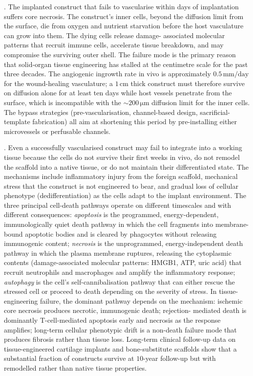 . The implanted construct that fails
to vascularise within days of implantation suffers core necrosis.
The construct's inner cells, beyond the diffusion limit from the
surface, die from oxygen and nutrient starvation before the host
vasculature can grow into them. The dying cells release damage-
associated molecular patterns that recruit immune cells, accelerate
tissue breakdown, and may compromise the surviving outer shell. The
failure mode is the primary reason that solid-organ tissue
engineering has stalled at the centimetre scale for the past three
decades. The angiogenic ingrowth rate in vivo is approximately
$0.5\,\text{mm/day}$ for the wound-healing vasculature; a
$1\,\text{cm}$ thick construct must therefore survive on diffusion
alone for at least ten days while host vessels penetrate from the
surface, which is incompatible with the $\sim 200\,\si{\micro\meter}$
diffusion limit for the inner cells. The bypass strategies
(pre-vascularisation, channel-based design, sacrificial-template
fabrication) all aim at shortening this period by pre-installing
either microvessels or perfusable channels.

. Even a successfully
vascularised construct may fail to integrate into a working tissue
because the cells do not survive their first weeks in vivo, do not
remodel the scaffold into a native tissue, or do not maintain their
differentiated state. The mechanisms include inflammatory injury
from the foreign scaffold, mechanical stress that the construct is
not engineered to bear, and gradual loss of cellular phenotype
(dedifferentiation) as the cells adapt to the implant environment.
The three principal cell-death pathways operate on different
timescales and with different consequences: \emph{apoptosis} is the
programmed, energy-dependent, immunologically quiet death pathway
\cite{paper:v6c05-roberts-apoptosis-1972} in which the cell
fragments into membrane-bound apoptotic bodies and is cleared by
phagocytes without releasing immunogenic content; \emph{necrosis} is
the unprogrammed, energy-independent death pathway in which the
plasma membrane ruptures, releasing the cytoplasmic contents
(damage-associated molecular patterns: HMGB1, ATP, uric acid) that
recruit neutrophils and macrophages and amplify the inflammatory
response; \emph{autophagy} is the cell's self-cannibalisation
pathway that can either rescue the stressed cell or proceed to
death depending on the severity of stress. In tissue-engineering
failure, the dominant pathway depends on the mechanism: ischemic
core necrosis produces necrotic, immunogenic death; rejection-
mediated death is dominantly T-cell-mediated apoptosis early and
necrosis as the response amplifies; long-term cellular phenotypic
drift is a non-death failure mode that produces fibrosis rather
than tissue loss. Long-term clinical follow-up data on
tissue-engineered cartilage implants and bone-substitute scaffolds
show that a substantial fraction of constructs survive at $10$-year
follow-up but with remodelled rather than native tissue properties.

